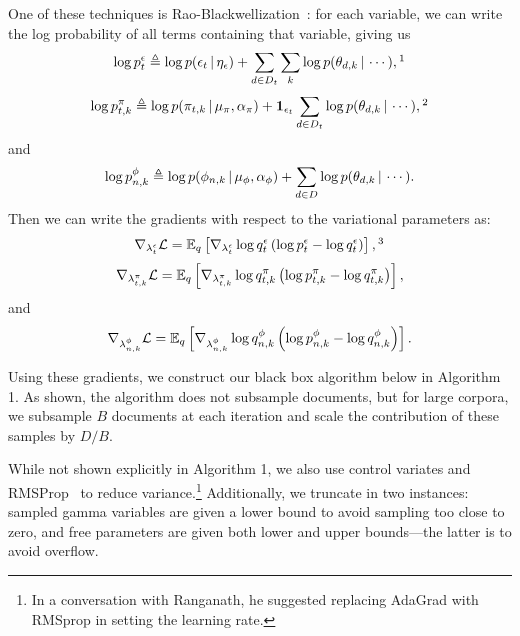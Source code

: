 One of these techniques is Rao-Blackwellization~\cite{Casella:1996}: for each variable, we can write the log probability of all terms containing that variable, giving us 
\[\log p^\epsilon_{t} \triangleq \log p(\epsilon_{t} \g \eta_\epsilon) + \sum_{d\in D_t}\sum_k\log p(\theta_{d,k} \g \cdots),\footnotemark\]
\[\log p^\pi_{t,k} \triangleq \log p(\pi_{t,k} \g \mu_\pi, \alpha_\pi) + \mathbf{1}_{\epsilon_t} \sum_{d\in D_t}\log p(\theta_{d,k} \g \cdots),\footnotemark\]
and
\[\log p^\phi_{n,k} \triangleq \log p(\phi_{n,k} \, | \, \mu_\phi, \alpha_\phi) + \sum_{d\in D} \log p(\theta_{d,k} \, | \, \cdots).\]
Then we can write the gradients with respect to the variational parameters as:
\[\nabla_{\lambda^\epsilon_{t}} \mathcal{L} = \E_q \left[ \nabla_{\lambda^\epsilon_{t}} \log q^\epsilon_{t} \left( \log p^\epsilon_{t} - \log q^\epsilon_{t} \right)\right],\footnotemark\]
\[\nabla_{\lambda^\pi_{t,k}} \mathcal{L} = \mathbb{E}_q \left[ \nabla_{\lambda^\pi_{t,k}} \log q^\pi_{t,k} \left( \log p^\pi_{t,k} - \log q^\pi_{t,k} \right)\right],\]
and
\[\nabla_{\lambda^\phi_{n,k}} \mathcal{L} = \mathbb{E}_q \left[ \nabla_{\lambda^\phi_{n,k}} \log q^\phi_{n,k} \left( \log p^\phi_{n,k} - \log q^\phi_{n,k} \right)\right].\]

Using these gradients, we construct our black box algorithm below in Algorithm 1.  As shown, the algorithm does not subsample documents, but for large corpora, we subsample $B$ documents at each iteration and scale the contribution of these samples by $D/B$.

While not shown explicitly in Algorithm 1, we also use control variates and RMSProp~\cite{Dauphin:2015} to reduce variance.\footnote{In a conversation with Ranganath, he suggested replacing AdaGrad with RMSprop in setting the learning rate.}
Additionally, we truncate in two instances: sampled gamma variables are given a lower bound to avoid sampling too close to zero, and free parameters are given both lower and upper bounds---the latter is to avoid overflow.


